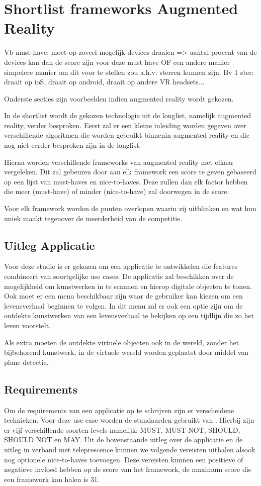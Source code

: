 \chapter{Shortlist frameworks Augmented Reality}
\label{ch:shortlist}

Vb must-have: moet op zoveel mogelijk devices draaien => aantal procent van de devices kan dan de score zijn voor deze must have
OF
een andere manier simpelere manier om dit voor te stellen zou a.h.v. sterren kunnen zijn. Bv 1 ster: draait op ioS, draait op android, draait op andere VR headsets...

Onderste secties zijn voorbeelden indien augmented reality wordt gekozen.


In de shortlist wordt de gekozen technologie uit de longlist, namelijk augmented reality, verder besproken.
Eerst zal er een kleine inleiding worden gegeven over verschillende algoritmen die worden gebruikt binnenin augmented reality en die nog niet eerder besproken zijn in de longlist.

Hierna worden verschillende frameworks van augmented reality met elkaar vergeleken. Dit zal gebeuren door aan elk framework een score te geven gebaseerd op een lijst van must-haves en nice-to-haves. Deze zullen dan elk factor hebben die meer (must-have) of minder (nice-to-have) zal doorwegen in de score.

Voor elk framework worden de punten overlopen waarin zij uitblinken en wat hun uniek maakt tegenover de meerderheid van de competitie.

\section{Uitleg Applicatie}
Voor deze studie is er gekozen om een applicatie te ontwikkelen die features combineert van soortgelijke use cases. De applicatie zal beschikken over de mogelijkheid om kunstwerken in te scannen en hierop digitale objecten te tonen. Ook moet er een menu beschikbaar zijn waar de gebruiker kan kiezen om een levensverhaal beginnen te volgen. In dit menu zal er ook een optie zijn om de ontdekte kunstwerken van een levensverhaal te bekijken op een tijdlijn die zo het leven voorstelt.

Als extra moeten de ontdekte virtuele objecten ook in de wereld, zonder het bijbehorend kunstwerk, in de virtuele wereld worden geplaatst door middel van plane detectie.

\section{Requirements}
Om de requirements van een applicatie op te schrijven zijn er verscheidene technieken. Voor deze use case worden de standaarden gebruikt van \textcite{Bradner1997}. Hierbij zijn er vijf verschillende soorten levels namelijk: MUST, MUST NOT, SHOULD, SHOULD NOT en MAY. Uit de bovenstaande uitleg over de applicatie en de uitleg in verband met teleprescence kunnen we volgende vereisten uithalen alsook nog optionele nice-to-haves toevoegen. Deze vereisten kunnen een positieve of negatieve invloed hebben op de score van het framework, de maximum score die een framework kan halen is 31.

